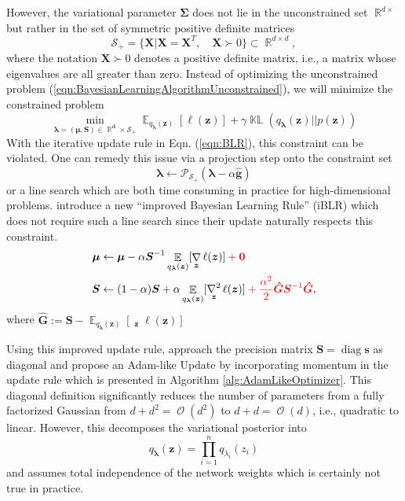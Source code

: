 \documentclass[a4paper, 11pt, oneside]{scrartcl}
\theoremstyle{break}
\DeclareMathOperator{\Real}{\mathbb{R}}
\DeclareMathOperator{\diag}{diag}
\DeclareMathOperator{\Expect}{\mathbb{E}}
\DeclareMathOperator{\grad}{\nabla}
\DeclareMathOperator{\Hessian}{\nabla^2}
\DeclareMathOperator{\BigO}{\mathcal{O}}
\DeclareMathOperator{\KL}{\mathbb{KL}}
\newcommand{\matr}[1]{\boldsymbol{#1}}
\newcommand{\set}[1]{\mathcal{#1}}
\numberwithin{equation}{section}
\begin{document}
		However, the variational parameter $\matr{\Sigma}$ does not lie in the unconstrained set $\Real^{d \times}$ but rather in the set of symmetric positive definite matrices
		\begin{equation}
			\set{S}_+ = \{\matr{X} | \matr{X} = \matr{X}^T, \quad \matr{X} \succ 0\} \subset \Real^{d \times d},
			\label{eqn:psdMatrices}
		\end{equation}
		where the notation $\matr{X} \succ 0$ denotes a positive definite matrix, i.e., a matrix whose eigenvalues are all greater than zero. 
		Instead of optimizing the unconstrained problem (\ref{eqn:BayesianLearningAlgorithmUnconstrained}), we will minimize the constrained problem
		\begin{equation}
			\min_{\matr{\lambda = (\matr{\mu}, \matr{S}) \in \Real^d \times \set{S}_+}} \Expect_{q_{\matr{\lambda}} (\matr{z})} [\ell (\matr{z})] + \gamma \KL (q_{\matr{\lambda}} (\matr{z}) || p (\matr{z}))
		\end{equation}
		With the iterative update rule in Eqn. (\ref{eqn:BLR}), this constraint can be violated. 
		One can remedy this issue via a projection step onto the constraint set
		\begin{equation}
			\matr{\lambda} \leftarrow \set{P}_{\set{S}_+} (\matr{\lambda} - \alpha \matr{\hat{g}})
		\end{equation}
		or a line search \parencite{SEH18} which are both time consuming in practice for high-dimensional problems.
		\parencite{LSK20} introduce a new ``improved Bayesian Learning Rule'' (iBLR) which does not require such a line search since their update naturally respects this constraint. 
		\begin{equation}
			\begin{aligned}
				\matr{\mu} &\leftarrow \matr{\mu} - \alpha \matr{S}^{-1} \Expect_{q_{\matr{\lambda}} (\matr{z})} [\grad_{\matr{z}} \ell (\matr{z})] \color{red} + \matr{0} \color{black} \\
				\matr{S} &\leftarrow (1 - \alpha) \matr{S} + \alpha \Expect_{q_{\matr{\lambda}} (\matr{z})} [\Hessian_{\matr{z}} \ell (\matr{z})] \color{red} + \frac{\alpha^2}{2} \matr{\hat{G}} \matr{S}^{-1} \matr{\hat{G}} \color{black},
			\end{aligned}
			\label{eqn:iBLR}
		\end{equation}
		where $\matr{\hat{G}} := \matr{S} - \Expect_{q_{\matr{\lambda}} (\matr{z})} [\Hessian_{\matr{z}} \ell (\matr{z})]$

		Using this improved update rule, \parencite{LSK20} approach the precision matrix $\matr{S} = \diag{\matr{s}}$ as diagonal and propose an Adam-like Update by incorporating momentum in the update rule which is presented in Algorithm \ref{alg:AdamLikeOptimizer}.
		This diagonal definition significantly reduces the number of parameters from a fully factorized Gaussian from $d + d^2 = \BigO(d^2)$ to $d + d = \BigO(d)$, i.e., quadratic to linear. 
		However, this decomposes the variational posterior into 
		\begin{equation*}
			q_{\matr{\lambda}} (\matr{z}) = \prod_{i=1}^n q_{\lambda_i} (z_i)
		\end{equation*}
		and assumes total independence of the network weights which is certainly not true in practice.
\end{document}
